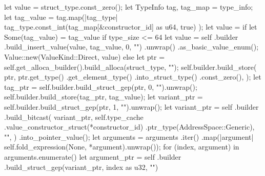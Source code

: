 \documentclass[
  oneside,
  english,
  coorientadorbanca,
  noabntexcite
]{ufsc-thesis-rn46-2019}
\begin{document}
\begin{rustcode}
{{{{{{                        let value = struct_type.const_zero();
                        let TypeInfo { tag, tag_map } = type_info;
                        let tag_value = tag.map(|tag_type| {
                            tag_type.const_int(tag_map[&constructor_id] as u64, true)
                        });
                        let value = if let Some(tag_value) = tag_value {
                            if type_size <= 64 {
                                let value = self
                                    .builder
                                    .build_insert_value(value, tag_value, 0, "")
                                    .unwrap()
                                    .as_basic_value_enum();
                                Value::new(ValueKind::Direct, value)
                            } else {
                                let ptr = self.get_alloca_builder().build_alloca(struct_type, "");
                                self.builder.build_store(
                                    ptr,
                                    ptr.get_type()
                                        .get_element_type()
                                        .into_struct_type()
                                        .const_zero(),
                                );
                                let tag_ptr = self.builder.build_struct_gep(ptr, 0, "").unwrap();
                                self.builder.build_store(tag_ptr, tag_value);
                                let variant_ptr =
                                    self.builder.build_struct_gep(ptr, 1, "").unwrap();
                                let variant_ptr = self
                                    .builder
                                    .build_bitcast(
                                        variant_ptr,
                                        self.type_cache
                                            .value_constructor_struct(*constructor_id)
                                            .ptr_type(AddressSpace::Generic),
                                        "",
                                    )
                                    .into_pointer_value();
                                let arguments = arguments
                                    .iter()
                                    .map(|argument| self.fold_expression(None, *argument).unwrap());
                                for (index, argument) in arguments.enumerate() {
                                    let argument_ptr = self
                                        .builder
                                        .build_struct_gep(variant_ptr, index as u32, "")
}}}}}}}}}
\end{rustcode}
\end{document}
